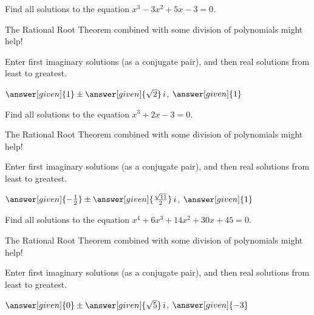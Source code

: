 \documentclass[nooutcomes]{ximera}
\begin{document}
\begin{problem}
Find all solutions to the equation $x^3-3x^2+5x-3=0$. 
\begin{hint} 
The Rational Root Theorem combined with some division of polynomials might help!
\end{hint}
Enter first imaginary solutions (as a conjugate pair), and then real solutions from least to greatest.

\begin{prompt}
$\answer[given]{1} \pm \answer[given]{\sqrt{2}}\,i$, $\answer[given]{1}$
\end{prompt}
\end{problem}


\begin{problem}
Find all solutions to the equation $x^3+2x-3=0$. 
\begin{hint} 
The Rational Root Theorem combined with some division of polynomials might help!
\end{hint}
Enter first imaginary solutions (as a conjugate pair), and then real solutions from least to greatest.

\begin{prompt}
$\answer[given]{-\frac{1}{2}} \pm \answer[given]{\frac{\sqrt{11}}{2}}\,i$, $\answer[given]{1}$
\end{prompt}
\end{problem}


\begin{problem}
Find all solutions to the equation $x^4+6x^3+14x^2+30x+45=0$. 
\begin{hint} 
The Rational Root Theorem combined with some division of polynomials might help!
\end{hint}
Enter first imaginary solutions (as a conjugate pair), and then real solutions from least to greatest.

\begin{prompt}
$\answer[given]{0} \pm \answer[given]{\sqrt{5}}\,i$, $\answer[given]{-3}$
\end{prompt}
\end{problem}
\end{document}

